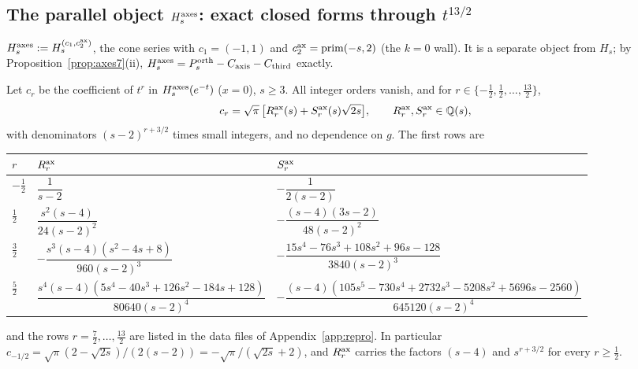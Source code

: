 \subsection{The parallel object $H_s^{\rm axes}$: exact closed forms through $t^{13/2}$}\label{sec:axes}
\begin{definition}\label{def:axes7}
$H_s^{\rm axes}:=H_s^{(c_1,c_2^{\rm ax})}$, the cone series with $c_1=(-1,1)$ and $c_2^{\rm ax}=\mathrm{prim}(-s,2)$ (the $k=0$ wall). It is a separate object from $H_s$; by Proposition~\ref{prop:axes7}(ii), $H_s^{\rm axes}=P^{\mathrm{orth}}_s-C_{\mathrm{axis}}-C_{\mathrm{third}}$ exactly.
\end{definition}
\begin{theorem}\label{thm:axes7}
Let $c_r$ be the coefficient of $t^r$ in $H_s^{\rm axes}(e^{-t})$ ($x=0$), $s\ge3$. All integer orders vanish, and for $r\in\{-\tfrac12,\tfrac12,\dots,\tfrac{13}2\}$,
\[c_r=\sqrt\pi\,\big[R^{\rm ax}_r(s)+S^{\rm ax}_r(s)\sqrt{2s}\big],\qquad R^{\rm ax}_r,S^{\rm ax}_r\in\mathbb{Q}(s),\]
with denominators $(s-2)^{r+3/2}$ times small integers, and no dependence on $g$. The first rows are
\begin{center}\footnotesize
\setlength{\tabcolsep}{4pt}\begin{tabular}{lll}\toprule
$r$ & $R^{\rm ax}_r$ & $S^{\rm ax}_r$\\\midrule
$-\tfrac12$ & $\dfrac1{s-2}$ & $-\dfrac1{2(s-2)}$\\[1ex]
$\tfrac12$ & $\dfrac{s^2(s-4)}{24(s-2)^2}$ & $-\dfrac{(s-4)(3s-2)}{48(s-2)^2}$\\[1ex]
$\tfrac32$ & $-\dfrac{s^3(s-4)(s^2-4s+8)}{960(s-2)^3}$ & $-\dfrac{15s^4-76s^3+108s^2+96s-128}{3840(s-2)^3}$\\[1ex]
$\tfrac52$ & $\dfrac{s^4(s-4)(5s^4-40s^3+126s^2-184s+128)}{80640(s-2)^4}$ & $-\dfrac{(s-4)(105s^5-730s^4+2732s^3-5208s^2+5696s-2560)}{645120(s-2)^4}$\\\bottomrule
\end{tabular}
\end{center}
and the rows $r=\tfrac72,\dots,\tfrac{13}2$ are listed in the data files of Appendix~\ref{app:repro}. In particular $c_{-1/2}=\sqrt\pi(2-\sqrt{2s})/(2(s-2))=-\sqrt\pi/(\sqrt{2s}+2)$, and $R^{\rm ax}_r$ carries the factors $(s-4)$ and $s^{r+3/2}$ for every $r\ge\tfrac12$.
\end{theorem}
